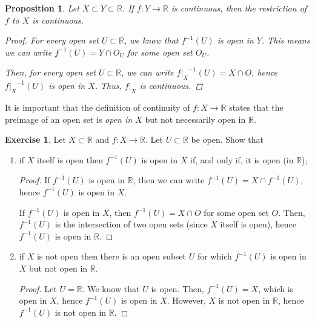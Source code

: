 \documentclass[11pt]{article}
\newcommand{\bbR}{\mathbb{R}}
\providecommand{\arr}{\to}
\renewcommand{\_}[1]{\underline{ #1 }}
\newtheorem{proposition}[theorem]{Proposition}
\theoremstyle{definition}
\newtheorem{exercise}[theorem]{Exercise}
\numberwithin{equation}{subsection}
\begin{document}
\begin{proposition}

Let $X\subset Y\subset \bbR$. If $f\colon Y\to \bbR$ is continuous, then the restriction of $f$ to $X$ is continuous.
\begin{proof}
For every open set $U \subset \bbR$, we know that $f^{-1}(U)$ is open in $Y$. This means we can write $f^{-1}(U) = Y \cap O_U$ for some open set $O_U$. 

Then, for every open set $U \subset \bbR$, we can write ${f|_X}^{-1}(U) = X \cap O$, hence ${f|_X}^{-1}(U)$ is open in $X$. Thus, $f|_X$ is continuous.

\renewcommand\qedsymbol{QED}
\end{proof}

\end{proposition}

It is important that the definition of continuity of $f\colon X\arr \bbR$ states that the preimage of an open set is 
{\em open in $X$} but not necessarily open in $\bbR$. 




\begin{exercise}  
 

Let $X\subset \bbR$ and $f:X\to \bbR.$ Let $U\subset \bbR$ be open.
Show that 
\begin{enumerate}
\item[i)] if $X$ itself is open then $f^{-1}(U)$ is open in $X$ if, and only if, it is open (in $\bbR$); 

\begin{proof}
If $f^{-1}(U)$ is open in $\bbR$, then we can write $f^{-1}(U) = X \cap f^{-1}(U)$, hence $f^{-1}(U)$ is open in $X$.

If $f^{-1}(U)$ is open in $X$, then $f^{-1}(U) = X \cap O$ for some open set $O$. Then, $f^{-1}(U)$ is the intersection of two open sets (since $X$ itself is open), hence $f^{-1}(U)$ is open in $\bbR$. 

\renewcommand\qedsymbol{QED}
\end{proof}


\item[ii)] if $X$ is not open then there is an open subset $U$ for which $f^{-1}(U)$ is open in $X$ but not open in $\bbR.$

\begin{proof}
Let $U = \bbR$. We know that $U$ is open. Then, $f^{-1}(U)=X$, which is open in $X$, hence $f^{-1}(U)$ is open in $X$. However, $X$ is not open in $\bbR$, hence $f^{-1}(U)$ is not open in $\bbR$.


\renewcommand\qedsymbol{QED}
\end{proof}


\end{enumerate}

\end{exercise}
\end{document}
